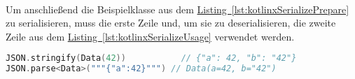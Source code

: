 \\
Um anschließend die Beispielklasse  aus dem \hyperref[lst:kotlinxSerializePrepare]{Listing~\ref{lst:kotlinxSerializePrepare}} zu serialisieren, muss die erste Zeile und, um sie zu deserialisieren, die zweite Zeile aus dem \hyperref[lst:kotlinxSerializeUsage]{Listing~\ref{lst:kotlinxSerializeUsage}} verwendet werden.
\\
\begin{lstlisting}[style=lstStyleFramed, language=Kotlin, caption={Beispiel: Serializierung und Deserialisierung der \code{Data} Klasse (verändert nach \cite{kotlinxSerializationExample})}, label=lst:kotlinxSerializeUsage, float]
JSON.stringify(Data(42))   		   // {"a": 42, "b": "42"}
JSON.parse<Data>("""{"a":42}""") // Data(a=42, b="42")
\end{lstlisting}

